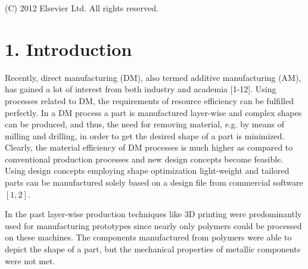 \documentclass[10pt]{article}
\begin{document}
\begin{abstract}
A B S T R A C T Direct manufacturing (DM), also referred to as additive manufacturing or additive layer manufacturing, has recently gained a lot of interest due to the feasibility of producing light-weight metallic components directly from design data. Selective laser melting is a very promising DM technique for providing near net shape components with relative high surface quality and bulk density. Still, process induced imperfections, i.e. micron sized pores and residual stresses upon processing, need to be considered for future application, e.g. in the aerospace and biomedical sectors. Moreover, fatigue loading is a critical scenario for such components and needs to be investigated thoroughly. Consequently, the current study aims at establishing sound microstructure-defect-property relationships under cyclic loading for a TiAl6V4 alloy processed by selective laser melting. Employing mechanical testing, hot isostatic pressing, electron microscopy and computer tomography it is shown that the micron sized pores mainly affect fatigue strength, while residual stresses have a strong impact on fatigue crack growth.
\end{abstract}

(C) 2012 Elsevier Ltd. All rights reserved.

\section*{1. Introduction}
Recently, direct manufacturing (DM), also termed additive manufacturing (AM), has gained a lot of interest from both industry and academia [1-12]. Using processes related to DM, the requirements of resource efficiency can be fulfilled perfectly. In a DM process a part is manufactured layer-wise and complex shapes can be produced, and thus, the need for removing material, e.g. by means of milling and drilling, in order to get the desired shape of a part is minimized. Clearly, the material efficiency of DM processes is much higher as compared to conventional production processes and new design concepts become feasible. Using design concepts employing shape optimization light-weight and tailored parts can be manufactured solely based on a design file from commercial software $[1,2]$.

In the past layer-wise production techniques like 3D printing were predominantly used for manufacturing prototypes since nearly only polymers could be processed on these machines. The components manufactured from polymers were able to depict the shape of a part, but the mechanical properties of metallic components were not met.
\end{document}
